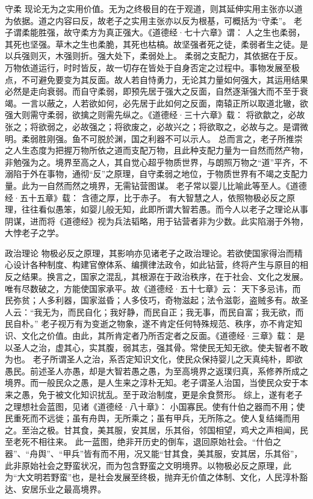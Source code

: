 \documentclass[11pt]{article}
\begin{document}
  守柔
  现论无为之实用价值。无为之终极目的在于观道，则其延伸实用主张亦以道为依据。道之内容曰反，故老子之实用主张亦以反为根基，可概括为“守柔”。
  老子谓柔能胜强，故守柔方为真正强大。《道德经·七十六章》谓：
  人之生也柔弱，其死也坚强。草木之生也柔脆，其死也枯槁。故坚强者死之徒，柔弱者生之徒。是以兵强则灭，木强则折。强大处下，柔弱处上。
  柔弱之支配力，其依据在于反。万物依道运行，时时皆反，故一切存在皆处于自身否定之过程中。事物发展至极点，不可避免要变为其反面。故人若自恃勇力，无论其力量如何强大，其运用结果必然是走向衰弱。而自守柔弱，即预先居于强大之反面，自然逐渐强大而不至于衰竭。一言以蔽之，人若欲如何，必先居于此如何之反面，南辕正所以取道北辙，欲强大则需守柔弱，欲擒之则需先纵之。《道德经·三十六章》载：
  将欲歙之，必故张之；将欲弱之，必故强之；将欲废之，必故兴之；将欲取之，必故与之。是谓微明。柔弱胜刚强。鱼不可脱於渊，国之利器不可以示人。
  总而言之，老子所推崇之人生态度为把握万物所依之道而支配万物，且此种支配力量为一自然而然产物，非勉强为之。境界至高之人，其自觉心超乎物质世界，与朗照万物之“道”平齐，不溺陷于外在事物，通彻“反”之原理，自守柔弱之地位，于物质世界有不竭之支配力量。此为一自然而然之境界，无需钻营图谋。
  老子常以婴儿比喻此等至人。《道德经·五十五章》载：
  含德之厚，比于赤子。
  有大智慧之人，依照物极必反之原理，往往看似愚笨，如婴儿般无知，此即所谓大智若愚。而今人以老子之理论从事阴谋，进而将《道德经》视为兵法韬略，用于钻营者非为少数。此实陷溺于外物，大悖老子之学。
  
  政治理论
  物极必反之原理，其影响亦见诸老子之政治理论。若欲使国家得治而精心设计各种制度、构建官僚体系、编撰律法政令，如此钻营，终将产生与原目的相反之结果。换言之，国家之混乱，其根源在于政治秩序，在于社会、文化之发展。唯有尽数破之，方能使国家承平。故《道德经·五十七章》云：
  天下多忌讳，而民弥贫；人多利器，国家滋昏；人多伎巧，奇物滋起；法令滋彰，盗贼多有。故圣人云：“我无为，而民自化；我好静，而民自正；我无事，而民自富；我无欲，而民自朴。”
  老子视万有为变逝之物象，遂不肯定任何特殊规范、秩序，亦不肯定知识、文化之价值。由此，其所肯定者乃所否定者之反面。《道德经·三章》载：
  是以圣人之治，虚其心，实其腹，弱其志，强其骨。常使民无知无欲。使夫智者不敢为也。
  老子所谓圣人之治，系否定知识文化，使民众保持婴儿之天真纯朴，即欲愚民。前述圣人亦愚，却是大智若愚之愚，为至高境界之返璞归真，系修养所成之境界。而一般民众之愚，是人生来之淳朴无知。老子谓圣人治国，当使民众安于本来之愚，免于被文化知识扰乱。至于政治制度，更是余食赘形。
  综上，遂有老子之理想社会蓝图，见诸《道德经·八十章》：
  小国寡民。使有什伯之器而不用；使民重死而不远徙；虽有舟舆，无所乘之；虽有甲兵，无所陈之。使人复结绳而用之。至治之极。甘其食，美其服，安其居，乐其俗，邻国相望，鸡犬之声相闻，民至老死不相往来。
  此一蓝图，绝非开历史的倒车，退回原始社会。“什伯之器”、“舟舆”、“甲兵”皆有而不用，况又能“甘其食，美其服，安其居，乐其俗”，此非原始社会之野蛮状况，而为包含野蛮之文明境界。以物极必反之原理，此为“大文明若野蛮”也，是社会发展至终极，抛弃无价值之体制、文化，人民淳朴豁达、安居乐业之最高境界。
  
\end{document}
